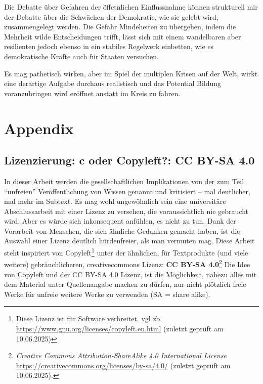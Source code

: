 Die Debatte über Gefahren der öffetnlichen Einflussnahme können strukturell mir der Debatte über die Schwächen der Demokratie, wie sie gelebt wird, zusammengelegt werden. Die Gefahr Mindeheiten zu übergehen, indem die Mehrheit wilde Entscheidungen trifft, lässt sich mit einem wandelbaren aber resilienten jedoch ebenso in ein stabiles Regelwerk einbetten, wie es demokratische Kräfte auch für Staaten versuchen. 

Es mag pathetisch wirken, aber im Spiel der multiplen Krisen auf der Welt, wirkt eine derartige Aufgabe durchaus realistisch und das Potential Bildung voranzubringen wird eröffnet anstatt im Kreis zu fahren. 





\clearpage
\newpage
\printbibliography[title=Literaturverzeichnis, heading=bibintoc, nottype=unused] 

\appendix %

\section{Appendix}
\subsection{Lizenzierung: \acrfull{c} oder Copyleft?: CC BY-SA 4.0 \label{lizenz}}
In dieser Arbeit werden die gesellschaftlichen Implikationen von der zum Teil \enquote{unfreien}  Veröffentlichung von Wissen genannt und kritisiert -- mal deutlicher, mal mehr im Subtext.
Es mag wohl ungewöhnlich sein eine universitäre Abschlussarbeit mit einer Lizenz zu versehen, die voraussichtlich nie gebraucht wird. Aber es würde sich inkonsequent anfühlen, es nicht zu tun.
Dank der Vorarbeit von Menschen, die sich ähnliche Gedanken gemacht haben, ist die Auswahl einer Lizenz deutlich hürdenfreier, als man vermuten mag. Diese Arbeit steht inspiriert von Copyleft\footnote{Diese Lizenz ist für Software verbreitet. \gls{vgl} \gls{zb} \url{https://www.gnu.org/licenses/copyleft.en.html} (zuletzt geprüft am 10.06.2025)} unter der ähnlichen, für Textprodukte (und viele weitere) gebräuchlicheren, creativecommons Lizenz: \textbf{CC BY-SA 4.0}\footnote{\emph{Creative Commons Attribution-ShareAlike 4.0 International License} \url{https://creativecommons.org/licenses/by-sa/4.0/} (zuletzt geprüft am 10.06.2025).} Die Idee von Copyleft und der CC BY-SA 4.0 Lizenz, ist die Möglichkeit, nahezu alles mit dem Material unter Quellenangabe machen zu dürfen, nur nicht plötzlich freie Werke für unfreie weitere Werke zu verwenden (SA = share alike). 

